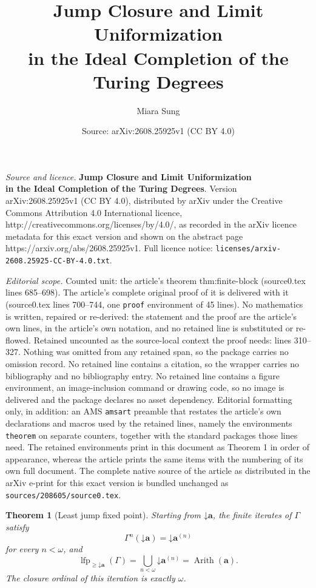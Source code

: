 \documentclass[10pt,a4paper]{amsart}
\title{\textbf{Jump Closure and Limit Uniformization\\in the Ideal Completion of the Turing Degrees}}
\author{Miara Sung}
\date{Source: arXiv:2608.25925v1 (CC BY 4.0)}
\newtheorem{theorem}{Theorem}
\newcommand{\down}{\mathord{\downarrow}}
\newcommand{\lfp}{\operatorname{lfp}}
\begin{document}
\maketitle

\noindent\emph{Source and licence.} \textbf{Jump Closure and Limit Uniformization\\in the Ideal Completion of the Turing Degrees}. Version arXiv:2608.25925v1 (CC BY 4.0), distributed by arXiv under the Creative Commons Attribution 4.0 International licence, http://creativecommons.org/licenses/by/4.0/, as recorded in the arXiv licence metadata for this exact version and shown on the abstract page https://arxiv.org/abs/2608.25925v1. Full licence notice: \texttt{licenses/arxiv-2608.25925-CC-BY-4.0.txt}.\par\smallskip

\noindent\textit{Editorial scope.} Counted unit: the article's theorem thm:finite-block (source0.tex lines 685--698). The article's complete original proof of it is delivered with it (source0.tex lines 700--744, one \texttt{proof} environment of 45 lines). No mathematics is written, repaired or re-derived: the statement and the proof are the article's own lines, in the article's own notation, and no retained line is substituted or re-flowed.  Retained uncounted as the source-local context the proof needs: lines 310--327.  Nothing was omitted from any retained span, so the package carries no omission record.  No retained line contains a citation, so the wrapper carries no bibliography and no bibliography entry.  No retained line contains a figure environment, an image-inclusion command or drawing code, so no image is delivered and the package declares no asset dependency.  Editorial formatting only, in addition: an AMS \texttt{amsart} preamble that restates the article's own declarations and macros used by the retained lines, namely the environments \texttt{theorem} on separate counters, together with the standard packages those lines need.  The retained environments print in this document as Theorem 1 in order of appearance, whereas the article prints the same items with the numbering of its own full document.  The complete native source of the article as distributed in the arXiv e-print for this exact version is bundled unchanged as \texttt{sources/208605/source0.tex}.
\begin{theorem}[Least jump fixed point]
\label{thm:least-jump-fixed}
Starting from $\down\mathbf a$, the finite iterates of $\Gamma$ satisfy
\begin{equation}
\Gamma^n(\down\mathbf a)=\down\mathbf a^{(n)}
\label{eq:finite-iterates}
\end{equation}
for every $n<\omega$, and
\begin{equation}
\lfp_{\geq\down\mathbf a}(\Gamma)
=
\bigcup_{n<\omega}\down\mathbf a^{(n)}
=
\operatorname{Arith}(\mathbf a).
\label{eq:relative-lfp}
\end{equation}
The closure ordinal of this iteration is exactly $\omega$.
\end{theorem}
\end{document}
